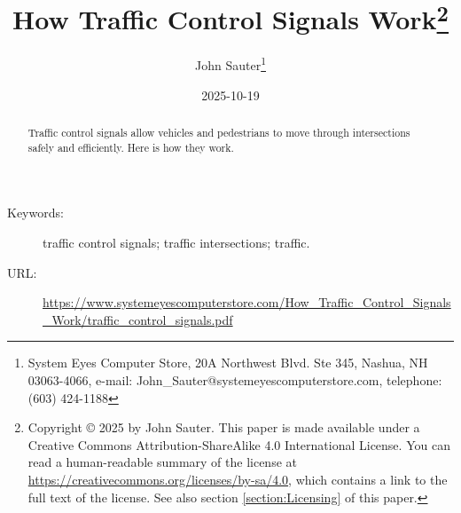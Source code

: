 \documentclass[letterpaper,twoside]{article}
\begin{document}
\title{How Traffic Control Signals Work\footnote{Copyright
    {\copyright} 2025 by John Sauter.
    This paper is made available under a
    Creative Commons Attribution-ShareAlike 4.0 International License.
    You can read a human-readable summary of the license at
    \href{https://creativecommons.org/licenses/by-sa/4.0}{https://creativecommons.org/licenses/by-sa/4.0},
    which contains a link to the full text of the license.
    See also section \ref{section:Licensing} of this paper.}
}
\author{John Sauter\footnote{
    System Eyes Computer Store,
    20A Northwest Blvd.  Ste 345,
    Nashua, NH  03063-4066,
    e-mail: John\_Sauter@systemeyescomputerstore.com,
    telephone: (603) 424-1188}}

\date{2025-10-19}
\maketitle
\begin{abstract}
  Traffic control signals allow vehicles and pedestrians to move through
  intersections safely and efficiently.  Here is how they work.
\end{abstract}
\begin{description}
\item[Keywords:]traffic control signals; traffic intersections; traffic.
\item[URL:]\href{https://www.systemeyescomputerstore.com/How\_Traffic\_Control\_Signals\_Work/traffic\_control\_signals.pdf}{https://www.systemeyescomputerstore.com/How\_Traffic\_Control\_Signals\_Work/traffic\_control\_signals.pdf}
\end{description}
\newpage
\end{document}
